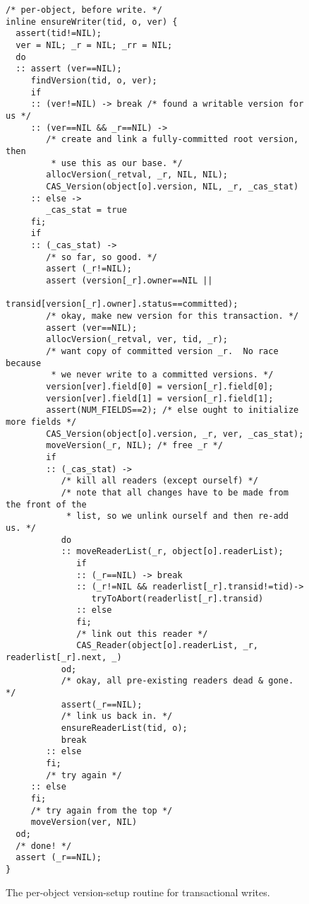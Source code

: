 \documentclass{csa-sig-alternate}
\begin{document}
\begin{figure}
\fontsize{6.5}{8}
\begin{verbatim}
/* per-object, before write. */
inline ensureWriter(tid, o, ver) {
  assert(tid!=NIL);
  ver = NIL; _r = NIL; _rr = NIL;
  do
  :: assert (ver==NIL);
     findVersion(tid, o, ver);
     if
     :: (ver!=NIL) -> break /* found a writable version for us */
     :: (ver==NIL && _r==NIL) ->
        /* create and link a fully-committed root version, then
         * use this as our base. */
        allocVersion(_retval, _r, NIL, NIL);
        CAS_Version(object[o].version, NIL, _r, _cas_stat)
     :: else ->
        _cas_stat = true
     fi;
     if
     :: (_cas_stat) ->
        /* so far, so good. */
        assert (_r!=NIL);
        assert (version[_r].owner==NIL ||
                transid[version[_r].owner].status==committed);
        /* okay, make new version for this transaction. */
        assert (ver==NIL);
        allocVersion(_retval, ver, tid, _r);
        /* want copy of committed version _r.  No race because
         * we never write to a committed versions. */
        version[ver].field[0] = version[_r].field[0];
        version[ver].field[1] = version[_r].field[1];
        assert(NUM_FIELDS==2); /* else ought to initialize more fields */
        CAS_Version(object[o].version, _r, ver, _cas_stat);
        moveVersion(_r, NIL); /* free _r */
        if
        :: (_cas_stat) ->
           /* kill all readers (except ourself) */
           /* note that all changes have to be made from the front of the
            * list, so we unlink ourself and then re-add us. */
           do
           :: moveReaderList(_r, object[o].readerList);
              if
              :: (_r==NIL) -> break
              :: (_r!=NIL && readerlist[_r].transid!=tid)->
                 tryToAbort(readerlist[_r].transid)
              :: else
              fi;
              /* link out this reader */
              CAS_Reader(object[o].readerList, _r, readerlist[_r].next, _)
           od;
           /* okay, all pre-existing readers dead & gone. */
           assert(_r==NIL);
           /* link us back in. */
           ensureReaderList(tid, o);
           break
        :: else
        fi;
        /* try again */
     :: else
     fi;
     /* try again from the top */
     moveVersion(ver, NIL)
  od;
  /* done! */
  assert (_r==NIL);
}
\end{verbatim}
\figadjust%
\caption{The per-object version-setup routine for transactional writes.}
\label{fig:ensurewriter}
\end{figure}
\end{document}
